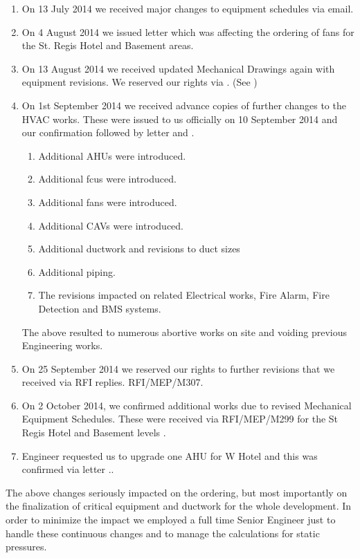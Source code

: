 \begin{enumerate}
\item On 13 July 2014 we received major changes to equipment schedules via email. 

\item On 4 August 2014 we issued letter  which was affecting the ordering of fans for the St. Regis Hotel and Basement areas.

\item On 13 August 2014  we received updated Mechanical Drawings again with equipment revisions. We reserved our rights via . (See )

\item On 1st September  2014 we received advance copies of further changes to the HVAC works. These were issued to us officially on 10 September 2014 and our confirmation followed by letter  and . 

\begin{enumerate}
  \item Additional AHUs were introduced.
  \item Additional fcus were introduced.
  \item Additional fans were introduced.
  \item Additional CAVs were introduced.
  \item Additional ductwork and revisions to duct sizes
  \item Additional piping.
  \item The revisions impacted on related Electrical works, Fire Alarm, Fire Detection and BMS systems. 
\end{enumerate}

The above resulted to numerous abortive works on site and voiding previous Engineering works.

\item On 25 September 2014 we reserved our rights to further revisions that we received via RFI replies. RFI/MEP/M307. 

\item On 2 October 2014, we confirmed additional works due to revised Mechanical Equipment Schedules. These were received via RFI/MEP/M299 for the St Regis Hotel and Basement levels .

\item Engineer requested us to upgrade one AHU for W Hotel and this was confirmed via letter ..
\end{enumerate}

The above changes seriously impacted on the ordering, but most importantly on the finalization of critical equipment and ductwork for the whole development. In order to minimize the impact we employed a full time Senior Engineer just to handle these continuous changes and to manage the calculations for static pressures.











